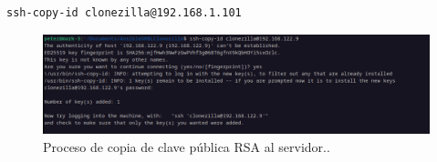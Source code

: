 \begin{lstlisting}[style=mybash]
ssh-copy-id clonezilla@192.168.1.101
\end{lstlisting}

\begin{figure}[H]
	\centering
	\includegraphics[scale=0.30]{anexo/copy-id}
	\caption{Proceso de copia de clave pública RSA al servidor..}
\end{figure}
	









%



%


